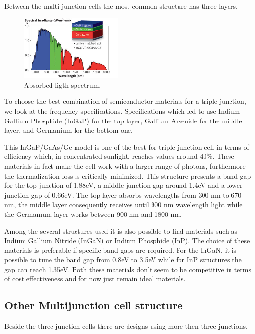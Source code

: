 \documentclass[11pt]{article} %
\begin{document}
Between the multi-junction cells the most common structure has three layers.  

\begin{figure}
	\centering
	\includegraphics[width=0.45\textwidth]{img/1212LFW04f2.jpg}
	\caption{Absorbed ligth spectrum.}
	\vspace{-10pt}
\end{figure}

To choose the best combination of semiconductor materials for a triple junction, we look at the frequency specifications. Specifications which led to use Indium Gallium Phosphide (InGaP) for the top layer, Gallium Arsenide for the middle layer, and Germanium for the bottom one. 

This InGaP/GaAs/Ge model is one of the best for triple-junction cell in terms of efficiency which, in concentrated sunlight, reaches values around 40\%. These materials in fact make the cell work with a larger range of photons, furthermore the thermalization loss is critically minimized. This structure presents a band gap for the top junction of 1.88eV, a middle junction gap around 1.4eV and a lower junction gap of 0.66eV. The top layer absorbs wavelengths from 300 nm to 670 nm, the middle layer consequently receives until 900 nm wavelength light while the Germanium layer works between 900 nm and 1800 nm. 

Among the several structures used it is also possible to find materials such as Indium Gallium Nitride (InGaN) or Indium Phosphide (InP). The choice of these materials is preferable if specific band gaps are required. For the InGaN, it is possible to tune the band gap from 0.8eV to 3.5eV while for InP structures the gap can reach 1.35eV. Both these materials don't seem to be competitive in terms of cost effectiveness and for now just remain ideal materials.

\subsection{Other Multijunction cell structure}

Beside the three-junction cells there are designs using more then three junctions.  
\end{document}
